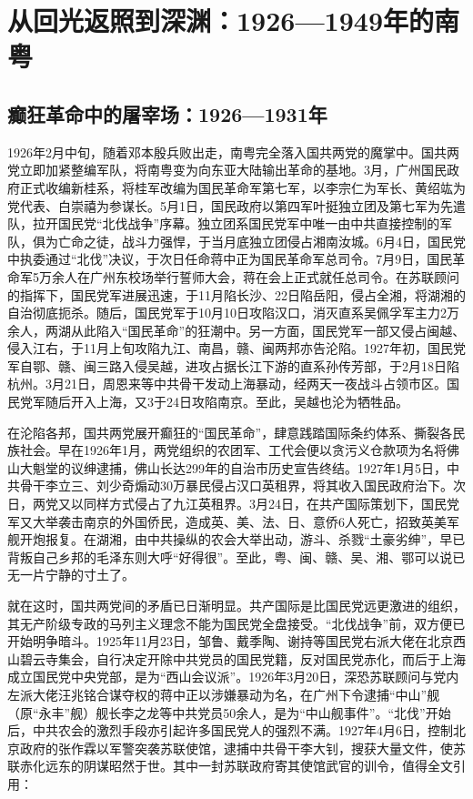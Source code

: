 \chapter{从回光返照到深渊：1926—1949年的南粤}

\section{癫狂革命中的屠宰场：1926—1931年}

1926年2月中旬，随着邓本殷兵败出走，南粤完全落入国共两党的魔掌中。国共两党立即加紧整编军队，将南粤变为向东亚大陆输出革命的基地。3月，广州国民政府正式收编新桂系，将桂军改编为国民革命军第七军，以李宗仁为军长、黄绍竑为党代表、白崇禧为参谋长。5月1日，国民政府以第四军叶挺独立团及第七军为先遣队，拉开国民党“北伐战争”序幕。独立团系国民党军中唯一由中共直接控制的军队，俱为亡命之徒，战斗力强悍，于当月底独立团侵占湘南汝城。6月4日，国民党中执委通过“北伐”决议，于次日任命蒋中正为国民革命军总司令。7月9日，国民革命军5万余人在广州东校场举行誓师大会，蒋在会上正式就任总司令。在苏联顾问的指挥下，国民党军进展迅速，于11月陷长沙、22日陷岳阳，侵占全湘，将湖湘的自治彻底扼杀。随后，国民党军于10月10日攻陷汉口，消灭直系吴佩孚军主力2万余人，两湖从此陷入“国民革命”的狂潮中。另一方面，国民党军一部又侵占闽越、侵入江右，于11月上旬攻陷九江、南昌，赣、闽两邦亦告沦陷。1927年初，国民党军自鄂、赣、闽三路入侵吴越，进攻占据长江下游的直系孙传芳部，于2月18日陷杭州。3月21日，周恩来等中共骨干发动上海暴动，经两天一夜战斗占领市区。国民党军随后开入上海，又3于24日攻陷南京。至此，吴越也沦为牺牲品。

在沦陷各邦，国共两党展开癫狂的“国民革命”，肆意践踏国际条约体系、撕裂各民族社会。早在1926年1月，两党组织的农团军、工代会便以贪污义仓款项为名将佛山大魁堂的议绅逮捕，佛山长达299年的自治市历史宣告终结。1927年1月5日，中共骨干李立三、刘少奇煽动30万暴民侵占汉口英租界，将其收入国民政府治下。次日，两党又以同样方式侵占了九江英租界。3月24日，在共产国际策划下，国民党军又大举袭击南京的外国侨民，造成英、美、法、日、意侨6人死亡，招致英美军舰开炮报复。在湖湘，由中共操纵的农会大举出动，游斗、杀戮“土豪劣绅”，早已背叛自己乡邦的毛泽东则大呼“好得很”。至此，粤、闽、赣、吴、湘、鄂可以说已无一片宁静的寸土了。

就在这时，国共两党间的矛盾已日渐明显。共产国际是比国民党远更激进的组织，其无产阶级专政的马列主义理念不能为国民党全盘接受。“北伐战争”前，双方便已开始明争暗斗。1925年11月23日，邹鲁、戴季陶、谢持等国民党右派大佬在北京西山碧云寺集会，自行决定开除中共党员的国民党籍，反对国民党赤化，而后于上海成立国民党中央党部，是为“西山会议派”。1926年3月20日，深恐苏联顾问与党内左派大佬汪兆铭合谋夺权的蒋中正以涉嫌暴动为名，在广州下令逮捕“中山”舰（原“永丰”舰）舰长李之龙等中共党员50余人，是为“中山舰事件”。“北伐”开始后，中共农会的激烈手段亦引起许多国民党人的强烈不满。1927年4月6日，控制北京政府的张作霖以军警突袭苏联使馆，逮捕中共骨干李大钊，搜获大量文件，使苏联赤化远东的阴谋昭然于世。其中一封苏联政府寄其使馆武官的训令，值得全文引用：

